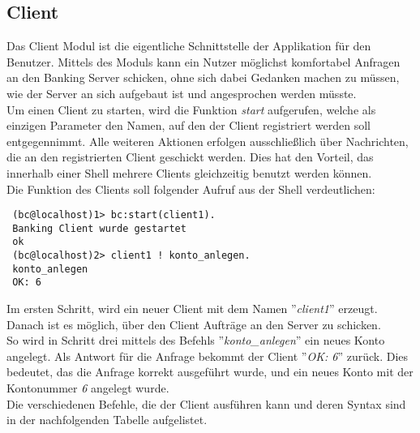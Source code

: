 \subsection{Client}
Das Client Modul ist die eigentliche Schnittstelle der Applikation für den Benutzer. Mittels des Moduls kann ein Nutzer möglichst komfortabel Anfragen an den Banking Server schicken, ohne sich dabei Gedanken machen zu müssen, wie der Server an sich aufgebaut ist und angesprochen werden müsste.\\
Um einen Client zu starten, wird die Funktion \textit{start} aufgerufen, welche als einzigen Parameter den Namen, auf den der Client registriert werden soll entgegennimmt. Alle weiteren Aktionen erfolgen ausschließlich über Nachrichten, die an den registrierten Client geschickt werden. Dies hat den Vorteil, das innerhalb einer Shell mehrere Clients gleichzeitig benutzt werden können.\\
Die Funktion des Clients soll folgender Aufruf aus der Shell verdeutlichen:
\begin{lstlisting} 
 (bc@localhost)1> bc:start(client1).
 Banking Client wurde gestartet
 ok
 (bc@localhost)2> client1 ! konto_anlegen.
 konto_anlegen
 OK: 6
\end{lstlisting}
Im ersten Schritt, wird ein neuer Client mit dem Namen ''\textit{client1}'' erzeugt. Danach ist es möglich, über den Client Aufträge an den Server zu schicken.\\ 
So wird in Schritt drei mittels des Befehls ''\textit{konto\_anlegen}'' ein neues Konto angelegt. Als Antwort für die Anfrage bekommt der Client ''\textit{OK: 6}'' zurück. Dies bedeutet, das die Anfrage korrekt ausgeführt wurde, und ein neues Konto mit der Kontonummer \textit{6} angelegt wurde.\\
Die verschiedenen Befehle, die der Client ausführen kann und deren Syntax sind in der nachfolgenden Tabelle aufgelistet.\\
